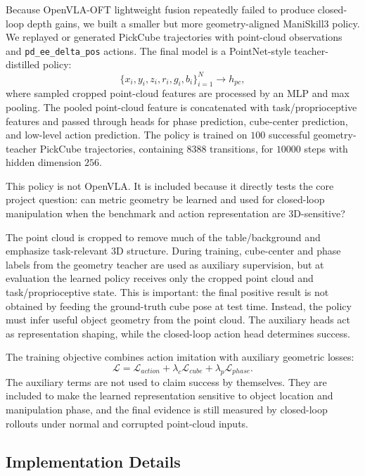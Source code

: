 \documentclass[conference]{IEEEtran}
\begin{document}
Because OpenVLA-OFT lightweight fusion repeatedly failed to produce closed-loop depth gains, we built a smaller but more geometry-aligned ManiSkill3 policy. We replayed or generated PickCube trajectories with point-cloud observations and \texttt{pd\_ee\_delta\_pos} actions. The final model is a PointNet-style teacher-distilled policy:
\begin{equation}
    \{x_i,y_i,z_i,r_i,g_i,b_i\}_{i=1}^{N}
    \rightarrow h_{pc},
\end{equation}
where sampled cropped point-cloud features are processed by an MLP and max pooling. The pooled point-cloud feature is concatenated with task/proprioceptive features and passed through heads for phase prediction, cube-center prediction, and low-level action prediction. The policy is trained on $100$ successful geometry-teacher PickCube trajectories, containing $8388$ transitions, for $10000$ steps with hidden dimension $256$.

This policy is not OpenVLA. It is included because it directly tests the core project question: can metric geometry be learned and used for closed-loop manipulation when the benchmark and action representation are 3D-sensitive?

The point cloud is cropped to remove much of the table/background and emphasize task-relevant 3D structure. During training, cube-center and phase labels from the geometry teacher are used as auxiliary supervision, but at evaluation the learned policy receives only the cropped point cloud and task/proprioceptive state. This is important: the final positive result is not obtained by feeding the ground-truth cube pose at test time. Instead, the policy must infer useful object geometry from the point cloud. The auxiliary heads act as representation shaping, while the closed-loop action head determines success.

The training objective combines action imitation with auxiliary geometric losses:
\begin{equation}
    \mathcal L =
    \mathcal L_{action}
    + \lambda_c \mathcal L_{cube}
    + \lambda_p \mathcal L_{phase}.
\end{equation}
The auxiliary terms are not used to claim success by themselves. They are included to make the learned representation sensitive to object location and manipulation phase, and the final evidence is still measured by closed-loop rollouts under normal and corrupted point-cloud inputs.

\subsection{Implementation Details}
\end{document}
